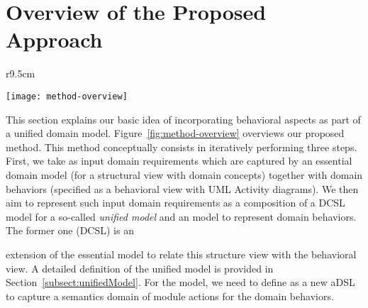 \section{Overview of the Proposed Approach}
\label{sect:overviewApproach}
{\makeatletter
	\let\par\@@par
	\par{}
	\everypar{}
	\begin{wrapfigure}{r}{9.5cm}
		\begin{center}
			\vspace{-1cm}		\texttt{[image: method-overview]}
		\end{center}
		\vspace{-0.5cm}	
		\caption{An overview of our method.} %
		\label{fig:method-overview}
	\end{wrapfigure}
This section explains our basic idea of incorporating behavioral aspects as part of a unified domain model.
%
%
%
Figure~\ref{fig:method-overview} overviews our proposed method. This method conceptually consists in iteratively performing three steps. First, we take as input domain requirements which are captured by an essential domain model (for a structural view with domain concepts) together with domain behaviors (specified as a behavioral view with UML Activity diagrams). We then aim to represent such input domain requirements as a composition of a DCSL model for a so-called \textit{unified model} and an \agl model to represent domain behaviors. The former one (DCSL) is an%
\par}%
\noindent 
extension of the essential model to relate this structure view with the behavioral view. A detailed definition of the unified model is provided in Section~\ref{subsect:unifiedModel}. For the \agl model, we need to define \agl as a new aDSL to capture a semantics domain of module actions for the domain behaviors. %
